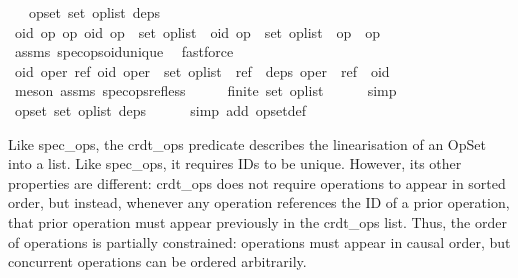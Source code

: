 \begin{isabellebody}
\ \ \ {\isachardoublequoteopen}opset\ {\isacharparenleft}set\ op{\isacharunderscore}list{\isacharparenright}\ deps{\isachardoublequoteclose}\isanewline
%
\isadelimproof
%
\endisadelimproof
%
\isatagproof
{}\isamarkupfalse%
\ {\isacharminus}\isanewline
\ \ \isamarkupfalse%
\ {\isachardoublequoteopen}{\isasymAnd}oid\ op{}\ op{}{\isachardot}\ {\isacharparenleft}oid{\isacharcomma}\ op{}{\isacharparenright}\ {\isasymin}\ set\ op{\isacharunderscore}list\ {\isasymLongrightarrow}\ {\isacharparenleft}oid{\isacharcomma}\ op{}{\isacharparenright}\ {\isasymin}\ set\ op{\isacharunderscore}list\ {\isasymLongrightarrow}\ op{}\ {\isacharequal}\ op{}{\isachardoublequoteclose}\isanewline
\ \ \ \ \isamarkupfalse%
\ assms\ spec{\isacharunderscore}ops{\isacharunderscore}oid{\isacharunderscore}unique\ \isamarkupfalse%
\ fastforce\isanewline
\ \ \isamarkupfalse%
\ \isamarkupfalse%
\ {\isachardoublequoteopen}{\isasymAnd}oid\ oper\ ref{\isachardot}\ {\isacharparenleft}oid{\isacharcomma}\ oper{\isacharparenright}\ {\isasymin}\ set\ op{\isacharunderscore}list\ {\isasymLongrightarrow}\ ref\ {\isasymin}\ deps\ oper\ {\isasymLongrightarrow}\ ref\ {\isacharless}\ oid{\isachardoublequoteclose}\isanewline
\ \ \ \ \isamarkupfalse%
\ {\isacharparenleft}meson\ assms\ spec{\isacharunderscore}ops{\isacharunderscore}ref{\isacharunderscore}less{\isacharparenright}\isanewline
\ \ \isamarkupfalse%
\ \isamarkupfalse%
\ {\isachardoublequoteopen}finite\ {\isacharparenleft}set\ op{\isacharunderscore}list{\isacharparenright}{\isachardoublequoteclose}\isanewline
\ \ \ \ \isamarkupfalse%
\ simp\isanewline
\ \ \isamarkupfalse%
\ \isamarkupfalse%
\ {\isachardoublequoteopen}opset\ {\isacharparenleft}set\ op{\isacharunderscore}list{\isacharparenright}\ deps{\isachardoublequoteclose}\isanewline
\ \ \ \ \isamarkupfalse%
\ {\isacharparenleft}simp\ add{\isacharcolon}\ opset{\isacharunderscore}def{\isacharparenright}\isanewline
{}\isamarkupfalse%
%
\endisatagproof
{\isafoldproof}%
%
\isadelimproof
%
\endisadelimproof
%
\isamarkuptrue%
%
\begin{isamarkuptext}%
Like spec\_ops, the crdt\_ops predicate describes the linearisation of
an OpSet into a list. Like spec\_ops, it requires IDs to be unique. However,
its other properties are different: crdt\_ops does not require operations to
appear in sorted order, but instead, whenever any operation references the
ID of a prior operation, that prior operation must appear previously in the
crdt\_ops list. Thus, the order of operations is partially constrained:
operations must appear in causal order, but concurrent operations can be
ordered arbitrarily.


\end{isamarkuptext}
\end{isabellebody}
